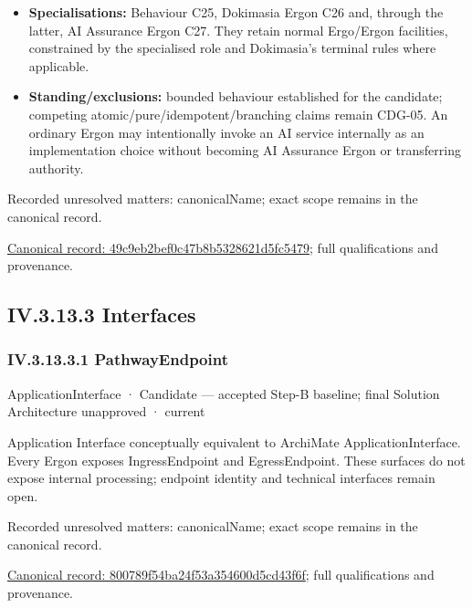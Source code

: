 \begin{itemize}
\item \textbf{Specialisations:} Behaviour C25, Dokimasia Ergon C26 and, through the latter,
  AI Assurance Ergon C27. They retain normal Ergo/Ergon facilities, constrained
  by the specialised role and Dokimasia's terminal rules where applicable.

\item \textbf{Standing/exclusions:} bounded behaviour established for the candidate;
  competing atomic/pure/idempotent/branching claims remain CDG-05. An ordinary
  Ergon may intentionally invoke an AI service internally as an implementation
  choice without becoming AI Assurance Ergon or transferring authority.

\end{itemize}

{\small Recorded unresolved matters: canonicalName; exact scope remains in the canonical record.}\par
{\footnotesize \href{../../../../../../../continuum/application/application-component/49c9eb2bef0c47b8b5328621d5fc5479.md}{Canonical record: 49c9eb2bef0c47b8b5328621d5fc5479}; full qualifications and provenance.}\par
\subsection*{IV.3.13.3 Interfaces}
\label{navigation:IV.3.13.3}

\subsubsection*{IV.3.13.3.1 PathwayEndpoint}
\label{navigation:IV.3.13.3.1}

\label{element:800789f54ba24f53a354600d5cd43f6f}
{\small ApplicationInterface · Candidate — accepted Step-B baseline; final Solution Architecture unapproved · current}\par

Application Interface conceptually equivalent to ArchiMate ApplicationInterface.
Every Ergon exposes IngressEndpoint and EgressEndpoint. These surfaces do not
expose internal processing; endpoint identity and technical interfaces remain open.


{\small Recorded unresolved matters: canonicalName; exact scope remains in the canonical record.}\par
{\footnotesize \href{../../../../../../../continuum/application/application-interface/800789f54ba24f53a354600d5cd43f6f.md}{Canonical record: 800789f54ba24f53a354600d5cd43f6f}; full qualifications and provenance.}\par
